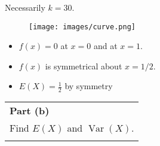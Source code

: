 \documentclass[a4paper,30pt]{article}
\begin{document}
Necessarily $k = 30$.


\begin{figure}[h!]
\centering
\texttt{[image: images/curve.png]}
\end{figure}

\begin{itemize}
    \item $f(x) = 0$ at $x = 0$ and at $x = 1$.
    \item $f(x)$ is symmetrical about $x = 1/2$.
 \item ${\displaystyle E(X) = \frac{1}{2} }$ by symmetry 
\end{itemize}

\newpage



    \begin{table}[ht!]
     \centering
     \begin{tabular}{|p{15cm}|}
     \hline \large        
\noindent \textbf{Part (b)} \\ \large Find $E(X)$ and $\operatorname{Var}(X)$.\\ \smallskip

\\ \hline
      \end{tabular}
    \end{table}
\end{document}
